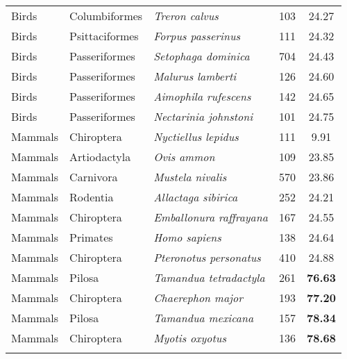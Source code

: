 \begin{longtable}{ll>{\itshape}lcc}
  Birds & Columbiformes & Treron calvus & 103 & 24.27 \\ 
  Birds & Psittaciformes & Forpus passerinus & 111 & 24.32 \\ 
  Birds & Passeriformes & Setophaga dominica & 704 & 24.43 \\ 
  Birds & Passeriformes & Malurus lamberti & 126 & 24.60 \\ 
  Birds & Passeriformes & Aimophila rufescens & 142 & 24.65 \\ 
  Birds & Passeriformes & Nectarinia johnstoni & 101 & 24.75 \\ 
  Mammals & Chiroptera & Nyctiellus lepidus & 111 & 9.91 \\ 
  Mammals & Artiodactyla & Ovis ammon & 109 & 23.85 \\ 
  Mammals & Carnivora & Mustela nivalis & 570 & 23.86 \\ 
  Mammals & Rodentia & Allactaga sibirica & 252 & 24.21 \\ 
  Mammals & Chiroptera & Emballonura raffrayana & 167 & 24.55 \\ 
  Mammals & Primates & Homo sapiens & 138 & 24.64 \\ 
  Mammals & Chiroptera & Pteronotus personatus & 410 & 24.88 \\ 
  Mammals & Pilosa & Tamandua tetradactyla & 261 & \textbf{76.63} \\ 
  Mammals & Chiroptera & Chaerephon major & 193 & \textbf{77.20} \\ 
  Mammals & Pilosa & Tamandua mexicana & 157 & \textbf{78.34} \\ 
  Mammals & Chiroptera & Myotis oxyotus & 136 & \textbf{78.68} \\ 
\hline
\label{table-percents}
\end{longtable}
